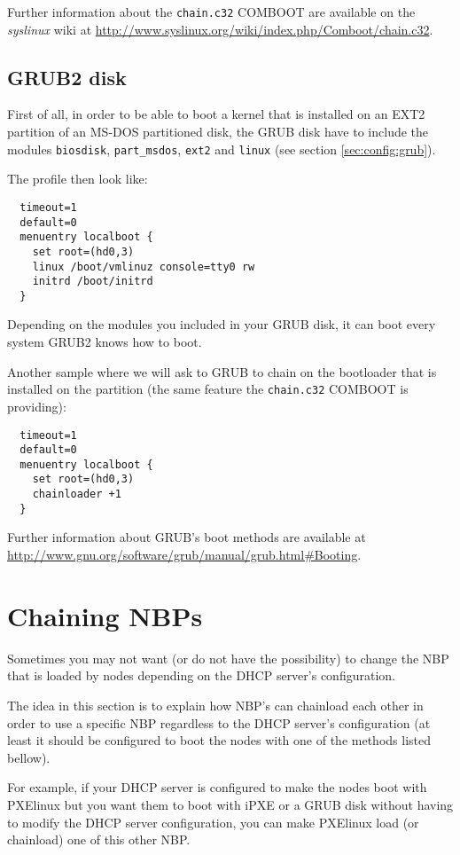 \documentclass[a4paper,11pt]{article}
\begin{document}
Further information about the \texttt{chain.c32} COMBOOT are available on the \emph{syslinux} wiki at \url{http://www.syslinux.org/wiki/index.php/Comboot/chain.c32}.


\subsection{GRUB2 disk}
First of all, in order to be able to boot a kernel that is installed on an EXT2 partition of an MS-DOS partitioned disk, the GRUB disk have to include the modules \texttt{biosdisk}, \texttt{part\_msdos}, \texttt{ext2} and \texttt{linux} (see section \ref{sec:config:grub}).

The profile then look like:
\begin{verbatim}
  timeout=1
  default=0
  menuentry localboot {
    set root=(hd0,3)
    linux /boot/vmlinuz console=tty0 rw
    initrd /boot/initrd
  }
\end{verbatim}

Depending on the modules you included in your GRUB disk, it can boot every system GRUB2 knows how to boot.

Another sample where we will ask to GRUB to chain on the bootloader that is installed on the partition (the same feature the \texttt{chain.c32} COMBOOT is providing):
\begin{verbatim}
  timeout=1
  default=0
  menuentry localboot {
    set root=(hd0,3)
    chainloader +1
  }
\end{verbatim}
\hrulefill

Further information about GRUB's boot methods are available at \url{http://www.gnu.org/software/grub/manual/grub.html#Booting}.


\section{Chaining NBPs}
Sometimes you may not want (or do not have the possibility) to change the NBP that is loaded by nodes depending on the DHCP server's configuration.

The idea in this section is to explain how NBP's can chainload each other in order to use a specific NBP regardless to the DHCP server's configuration (at least it should be configured to boot the nodes with one of the methods listed bellow).

For example, if your DHCP server is configured to make the nodes boot with PXElinux but you want them to boot with iPXE or a GRUB disk without having to modify the DHCP server configuration, you can make PXElinux load (or chainload) one of this other NBP.
\end{document}

